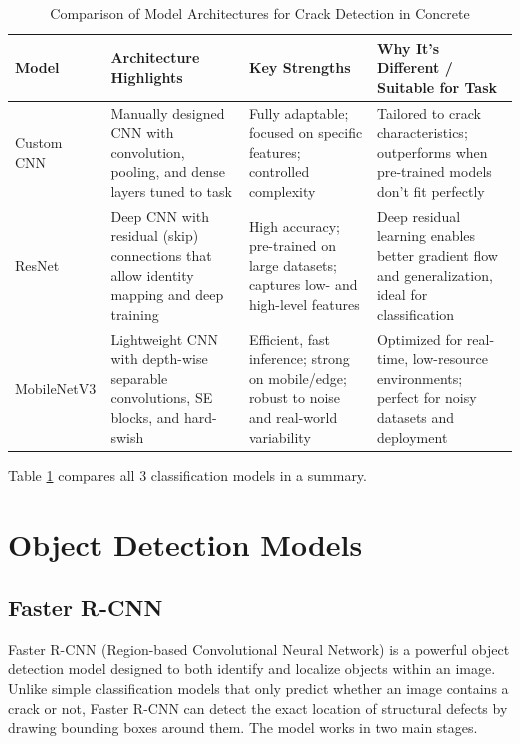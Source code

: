 \begin{table}[htbp]
	\centering
	\renewcommand{\arraystretch}{1.3}
	\begin{tabular}{|p{2.4cm}|p{4.3cm}|p{4.3cm}|p{4.3cm}|}
		\hline
		\textbf{Model} & \textbf{Architecture Highlights} & \textbf{Key Strengths} & \textbf{Why It's Different / Suitable for Task} \\
		\hline
		Custom CNN & Manually designed CNN with convolution, pooling, and dense layers tuned to task & Fully adaptable; focused on specific features; controlled complexity & Tailored to crack characteristics; outperforms when pre-trained models don't fit perfectly \\
		\hline
		ResNet & Deep CNN with residual (skip) connections that allow identity mapping and deep training & High accuracy; pre-trained on large datasets; captures low- and high-level features & Deep residual learning enables better gradient flow and generalization, ideal for classification \\
		\hline
		MobileNetV3 & Lightweight CNN with depth-wise separable convolutions, SE blocks, and hard-swish & Efficient, fast inference; strong on mobile/edge; robust to noise and real-world variability & Optimized for real-time, low-resource environments; perfect for noisy datasets and deployment \\
		\hline
	\end{tabular}
	\caption{Comparison of Model Architectures for Crack Detection in Concrete}
	\label{tab:model_comparison}
\end{table}

Table \ref{tab:model_comparison} compares all 3 classification models in a summary.


\section{Object Detection Models}

\subsection{Faster R-CNN}

Faster R-CNN (Region-based Convolutional Neural Network) is a powerful object detection model designed to both identify and localize objects within an image. Unlike simple classification models that only predict whether an image contains a crack or not, Faster R-CNN can detect the exact location of structural defects by drawing bounding boxes around them. The model works in two main stages.\cite{NIPS2015_14bfa6bb}

